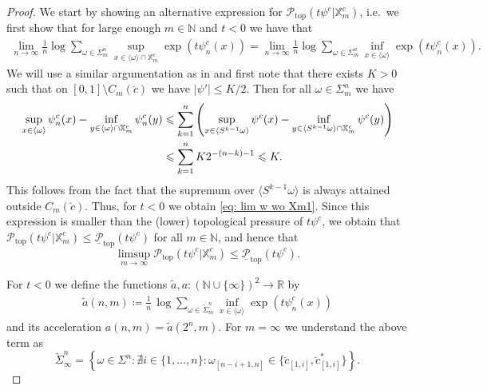 \documentclass[11pt,reqno]{amsart}
\theoremstyle{plain}
\theoremstyle{definition}
\newcommand{\N}{{\mathbb N}}
\begin{document}
\begin{proof}
We start by showing an alternative expression for $\mathcal{P}_{\operatorname{top}}(t \psi^{c} \vert \mathbb{X}_m^{c})$, i.e.\ we first show that for
large enough $m\in\mathbb{N}$ and $t< 0$ we have that 
\begin{align}
 \lim_{n\to\infty}\frac{1}{n} \log \sum_{\omega\in \Sigma_m^{n}}\sup_{x\in  \langle\omega\rangle\cap\mathbb{X}_m^{c}}\exp\left(t \psi_{n}^{c}(x)\right)
 = \lim_{n\to\infty}\frac{1}{n} \log \sum_{ \omega\in \Sigma_{m}^{n}}\inf_{x\in  \langle\omega\rangle}\exp\left(t \psi_{n}^{c}(x)\right).\label{eq: lim w wo Xm1}
\end{align}
We will use a similar argumentation as in \cite[Proof of Lem.~4.1]{BGKS} and first note that 
there exists $K>0$ such that on $[0,1]\setminus C_m(\breve{c})$ we have $|\psi'|\leqslant K/2$. 
Then 
for all $\omega\in\Sigma_m^n$ we have 
\begin{align*}
 \sup_{x\in \langle\omega\rangle}\psi_n^{c}(x)- \inf_{y\in \langle\omega\rangle\cap\mathbb{X}_m^{c}}\psi_n^{c}(y)
 &\leqslant \sum_{k=1}^n \left(\sup_{x\in \langle S^{k-1}\omega\rangle}\psi^{c}(x)- \inf_{y\in \langle S^{k-1}\omega\rangle\cap\mathbb{X}_m^{c}}\psi^{c}(y)  \right)\notag\\
 &\leqslant  \sum_{k=1}^n K 2^{-(n-k)-1}\leqslant K.%
\end{align*}
This follows from the fact that the supremum over $\langle S^{k-1}\omega\rangle$ is always attained outside $C_m(\breve{c})$.
Thus, for $t<0$ we obtain \eqref{eq: lim w wo Xm1}.
Since this expression is smaller than the (lower) topological pressure of $t \psi^c$, we obtain that
$
\mathcal{P}_{\operatorname{top}}(t \psi^{c} \vert \mathbb{X}_m^{c}) 
\leqslant \underline{\mathcal{P}}_{\operatorname{top}}(t \psi^{c}) 
$
for all $m \in \N$, and hence that 
\begin{equation}
\label{EQ:pressure-upper-estimate}
\limsup_{m \to \infty} \mathcal{P}_{\operatorname{top}}(t \psi^{c} \vert \mathbb{X}_m^{c})  \leqslant \underline{\mathcal{P}}_{\operatorname{top}}(t \psi^{c}).
\end{equation}

For $t<0$ we define the functions $\widetilde a , a\colon \left(\mathbb{N}\cup\{\infty\}\right)^2\to\mathbb{R}$ by 
 \begin{align*}
  \widetilde a\left(n,m\right)\coloneqq 
  \frac{1}{n}\, \log \sum_{\omega\in \widetilde \Sigma_{m}^{n}}\inf_{x\in  \langle\omega\rangle}\exp\left(t \psi_{n}^{c}(x)\right)
 \end{align*}
 and its acceleration $a(n,m) = \widetilde a (2^n,m)$.
 For $m=\infty$ we understand the above term as
 $$\widetilde \Sigma_{\infty}^n = \left\{\omega\in\Sigma^n\colon \nexists i\in \{1, \ldots, n \} \colon \omega_{[n-i+1,n]}\in\big\{\breve{c}_{[1,i]},\breve{c}^{\ast}_{[1,i]}\big\}
 \right\}.$$ 
 

\end{proof}
\end{document}
